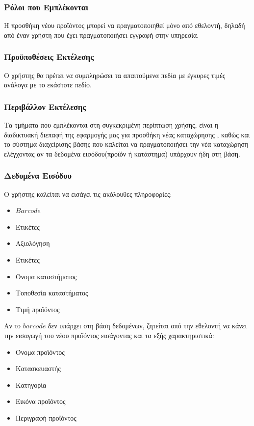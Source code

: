 \documentclass[12pt]{article}
\begin{document}
\subsubsection{Ρόλοι που Εμπλέκονται}

Η προσθήκη νέου προϊόντος μπορεί να πραγματοποιηθεί μόνο από εθελοντή, δηλαδή από έναν χρήστη που έχει πραγματοποιήσει εγγραφή στην υπηρεσία.

\subsubsection{Προϋποθέσεις Εκτέλεσης}

Ο χρήστης θα πρέπει να συμπληρώσει τα απαιτούμενα πεδία με έγκυρες τιμές ανάλογα με το εκάστοτε πεδίο. 

\subsubsection{Περιβάλλον Εκτέλεσης}

Τα τμήματα που εμπλέκονται στη συγκεκριμένη περίπτωση χρήσης, είναι η διαδικτυακή διεπαφή της εφαρμογής μας για προσθήκη νέας καταχώρησης , καθώς και το σύστημα διαχείρισης βάσης που καλείται να πραγματοποιήσει την νέα καταχώρηση ελέγχοντας αν τα δεδομένα εισόδου(προϊόν ή κατάστημα) υπάρχουν ήδη στη βάση. 

\subsubsection{Δεδομένα Εισόδου}

Ο χρήστης καλείται να εισάγει τις ακόλουθες πληροφορίες:

\begin{itemize}
\item $Barcode$
\item Ετικέτες
\item Αξιολόγηση
\item Ετικέτες
\item Όνομα καταστήματος
\item Τοποθεσία καταστήματος
\item Τιμή προϊόντος
\end{itemize}

Αν το $barcode$ δεν υπάρχει στη βάση δεδομένων, ζητείται από την εθελοντή να κάνει την εισαγωγή του νέου προϊόντος εισάγοντας και τα εξής χαρακτηριστικά:

\begin{itemize}
\item Όνομα προϊόντος
\item Κατασκευαστής
\item Κατηγορία
\item Εικόνα προϊόντος
\item Περιγραφή προϊόντος
\end{itemize}
\end{document}
